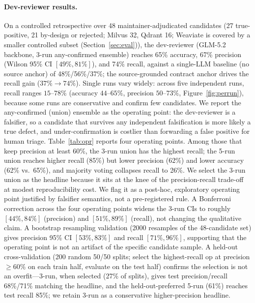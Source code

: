\documentclass[sigconf]{acmart}
\begin{document}
\paragraph{Dev-reviewer results.}
On a controlled retrospective over 48 maintainer-adjudicated candidates (27 true-positive, 21 by-design or rejected; Milvus 32, Qdrant 16; Weaviate is covered by a smaller controlled subset (Section~\ref{sec:eval})), the dev-reviewer (GLM-5.2 backbone, 3-run any-confirmed ensemble) reaches 65\% accuracy, 67\% precision (Wilson 95\% CI $[49\%, 81\%]$), and 74\% recall, against a single-LLM baseline (no source anchor) of 48\%/56\%/37\%; the source-grounded contract anchor drives the recall gain ($37\%\to74\%$). Single runs vary widely: across five independent runs, recall ranges $15$--$78\%$ (accuracy $44$--$65\%$, precision $50$--$73\%$, Figure~\ref{fig:perrun}), because some runs are conservative and confirm few candidates. We report the any-confirmed (union) ensemble as the operating point: the dev-reviewer is a falsifier, so a candidate that survives any independent falsification is more likely a true defect, and under-confirmation is costlier than forwarding a false positive for human triage. Table~\ref{tab:opr} reports four operating points. Among those that keep precision at least 60\%, the 3-run union has the highest recall; the 5-run union reaches higher recall (85\%) but lower precision (62\%) and lower accuracy (62\% vs.\ 65\%), and majority voting collapses recall to 26\%. We select the 3-run union as the headline because it sits at the knee of the precision-recall trade-off at modest reproducibility cost. We flag it as a post-hoc, exploratory operating point justified by falsifier semantics, not a pre-registered rule. A Bonferroni correction across the four operating points widens the 3-run CIs to roughly $[44\%, 84\%]$ (precision) and $[51\%, 89\%]$ (recall), not changing the qualitative claim. A bootstrap resampling validation (2000 resamples of the 48-candidate set) gives precision 95\% CI $[53\%, 83\%]$ and recall $[71\%, 96\%]$, supporting that the operating point is not an artifact of the specific candidate sample. A held-out cross-validation (200 random 50/50 splits; select the highest-recall op at precision $\geq 60\%$ on each train half, evaluate on the test half) confirms the selection is not an overfit---3-run, when selected (27\% of splits), gives test precision/recall 68\%/71\% matching the headline, and the held-out-preferred 5-run (61\%) reaches test recall 85\%; we retain 3-run as a conservative higher-precision headline.
\end{document}
